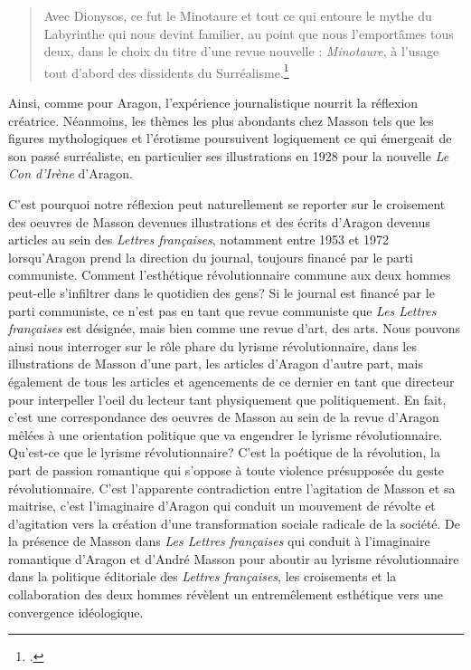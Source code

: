  \begin{quote}
 Avec Dionysos, ce fut le Minotaure et tout ce qui entoure le mythe du Labyrinthe qui nous devint familier, au point que nous l'emportâmes tous deux, dans le choix du titre d'une revue nouvelle : \emph{Minotaure}, à l'usage tout d'abord des dissidents du Surréalisme.\footcite[p130]{memoiremonde}\end{quote}
 
 Ainsi, comme pour Aragon, l’expérience journalistique nourrit la réflexion créatrice. Néanmoins, les thèmes les plus abondants chez Masson tels que les figures mythologiques et l'érotisme poursuivent logiquement ce qui émergeait de son passé surréaliste, en particulier ses illustrations en 1928 pour la nouvelle \emph{Le Con d'Irène} d'Aragon. 

C’est pourquoi notre réflexion peut naturellement se reporter sur le croisement des oeuvres de Masson devenues illustrations et des écrits d’Aragon devenus articles au sein des \emph{Lettres françaises}, notamment entre 1953 et 1972 lorsqu’Aragon prend la direction du journal, toujours financé par le parti communiste. Comment l’esthétique révolutionnaire commune aux deux hommes peut-elle s’infiltrer dans le quotidien des gens? Si le journal est financé par le parti communiste, ce n’est pas en tant que revue communiste que \emph{Les Lettres françaises} est désignée, mais bien comme une revue d’art, des arts. Nous pouvons ainsi nous interroger sur le rôle phare du lyrisme révolutionnaire, dans les illustrations de Masson d’une part, les articles d’Aragon d’autre part, mais également de tous les articles et agencements de ce dernier en tant que directeur pour interpeller l’oeil du lecteur tant physiquement que politiquement. En fait, c’est une correspondance des oeuvres de Masson au sein de la revue d’Aragon mêlées à une orientation politique que va engendrer le lyrisme révolutionnaire. Qu’est-ce que le lyrisme révolutionnaire? C’est la poétique de la révolution, la part de passion romantique qui s’oppose à toute violence présupposée du geste révolutionnaire. C’est l’apparente contradiction entre l’agitation de Masson et sa maitrise, c’est l’imaginaire d’Aragon qui conduit un mouvement de révolte et d’agitation vers la création d’une transformation sociale radicale de la société. De la présence de Masson dans \emph{Les Lettres françaises} qui conduit à l’imaginaire romantique d’Aragon et d’André Masson pour aboutir au lyrisme révolutionnaire dans la politique éditoriale des \emph{Lettres françaises}, les croisements et la collaboration des deux hommes révèlent un entremêlement esthétique vers une convergence idéologique. 